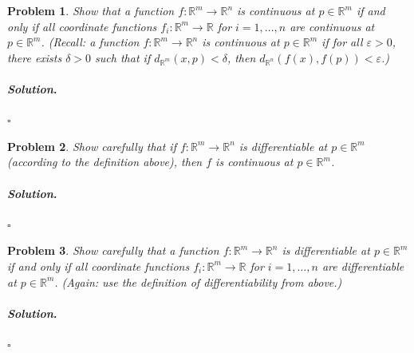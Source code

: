 \documentclass[reqno]{amsart}
\theoremstyle{plain}
\newtheorem{problem}{Problem}
\theoremstyle{definition}
\newenvironment{solution}{\paragraph{\emph{Solution}.}}{\hfill$\square$}
\begin{document}
\begin{problem}
Show that a function $f:\mathbb{R}^{m} \rightarrow \mathbb{R}^{n}$ is continuous at $p \in \mathbb{R}^{m}$ if and only if all coordinate functions $f_{i}:\mathbb{R}^{m} \rightarrow \mathbb{R}$ for $i=1,\ldots,n$ are continuous at $p \in \mathbb{R}^{m}$.  (Recall:  a function $f:\mathbb{R}^{m} \rightarrow \mathbb{R}^{n}$ is continuous at $p \in \mathbb{R}^{m}$ if for all $\varepsilon > 0$, there exists $\delta > 0$ such that if $d_{\mathbb{R}^{m}}(x,p)< \delta$, then $d_{\mathbb{R}^{n}}(f(x),f(p))< \varepsilon$.)
\end{problem}
\begin{solution}

\end{solution}

\begin{problem}
Show carefully that if $f:\mathbb{R}^{m} \rightarrow \mathbb{R}^{n}$ is differentiable at $p \in \mathbb{R}^{m}$ (according to the definition above), then $f$ is continuous at $p \in \mathbb{R}^{m}$.
\end{problem}
\begin{solution}

\end{solution}

\begin{problem}
Show carefully that a function $f:\mathbb{R}^{m} \rightarrow \mathbb{R}^{n}$ is differentiable at $p \in \mathbb{R}^{m}$ if and only if all coordinate functions $f_{i}:\mathbb{R}^{m} \rightarrow \mathbb{R}$ for $i=1,\ldots,n$ are differentiable at $p \in \mathbb{R}^{m}$.  (Again: use the definition of differentiability from above.)   
\end{problem}
\begin{solution}

\end{solution}
\end{document}
